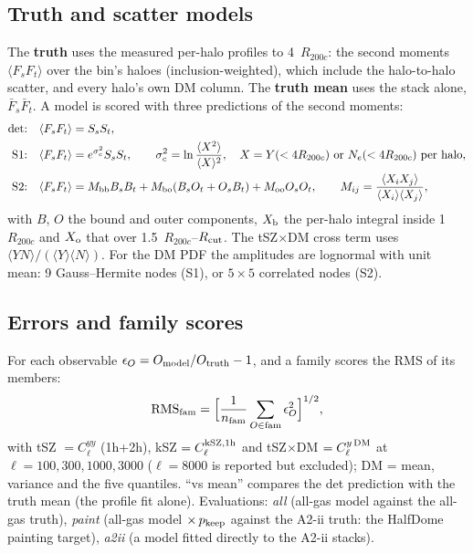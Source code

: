\documentclass[10pt,a4paper]{article}
\newcommand{\Rc}{R_{200c}}
\newcommand{\Rcut}{R_{\rm cut}}
\newcommand{\pk}{p_{\rm keep}}
\begin{document}
\subsection{Truth and scatter models}
The \textbf{truth} uses the measured per-halo profiles to 4~$\Rc$: the second moments $\langle F_sF_t\rangle$ over the bin's
haloes (inclusion-weighted), which include the halo-to-halo scatter, and every halo's own DM column. The \textbf{truth mean}
uses the stack alone, $\bar F_s\bar F_t$. A model is scored with three predictions of the second moments:
\begin{align}
\text{det:}\quad&\langle F_sF_t\rangle=S_sS_t,\\
\text{S1:}\quad&\langle F_sF_t\rangle=e^{\sigma_c^2}S_sS_t,\qquad \sigma_c^2=\ln\frac{\langle X^2\rangle}{\langle X\rangle^2},\quad
X=Y(<4\Rc)\ \text{or}\ N_e(<4\Rc)\ \text{per halo},\\
\text{S2:}\quad&\langle F_sF_t\rangle=M_{\rm bb}B_sB_t+M_{\rm bo}(B_sO_t+O_sB_t)+M_{\rm oo}O_sO_t,\qquad
M_{ij}=\frac{\langle X_iX_j\rangle}{\langle X_i\rangle\langle X_j\rangle},
\end{align}
with $B$, $O$ the bound and outer components, $X_{\rm b}$ the per-halo integral inside 1~$\Rc$ and $X_{\rm o}$ that over
1.5~$\Rc$--$\Rcut$. The tSZ$\times$DM cross term uses $\langle YN\rangle/(\langle Y\rangle\langle N\rangle)$. For the DM PDF
the amplitudes are lognormal with unit mean: 9 Gauss--Hermite nodes (S1), or $5\times5$ correlated nodes (S2).

\subsection{Errors and family scores}
For each observable $\epsilon_O=O_{\rm model}/O_{\rm truth}-1$, and a family scores the RMS of its members:
\begin{equation}
{\rm RMS}_{\rm fam}=\Bigl[\frac{1}{n_{\rm fam}}\sum_{O\in{\rm fam}}\epsilon_O^2\Bigr]^{1/2},
\end{equation}
with tSZ $=C_\ell^{yy}$ (1h+2h), kSZ $=C_\ell^{\rm kSZ,1h}$ and tSZ$\times$DM $=C_\ell^{y\,\rm DM}$ at $\ell=100,300,1000,3000$
($\ell=8000$ is reported but excluded); DM = mean, variance and the five quantiles. ``vs mean'' compares the det prediction
with the truth mean (the profile fit alone). Evaluations: \emph{all} (all-gas model against the all-gas truth),
\emph{paint} (all-gas model $\times\,\pk$ against the A2-ii truth: the HalfDome painting target), \emph{a2ii} (a model
fitted directly to the A2-ii stacks).
\end{document}
